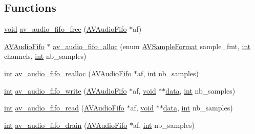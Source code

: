 \subsection*{Functions}
\begin{DoxyCompactItemize}
\item 
\hyperlink{sound_8c_ae35f5844602719cf66324f4de2a658b3}{void} \hyperlink{group__lavu__audio_ga74e029e47f7aa99217ad1f315c434875}{av\+\_\+audio\+\_\+fifo\+\_\+free} (\hyperlink{group__lavu__audio_ga328abb21e9abb2c455d2d9c212d5230f}{A\+V\+Audio\+Fifo} $\ast$af)
\item 
\hyperlink{group__lavu__audio_ga328abb21e9abb2c455d2d9c212d5230f}{A\+V\+Audio\+Fifo} $\ast$ \hyperlink{group__lavu__audio_ga9d792394f0615a329aec47847f8f8784}{av\+\_\+audio\+\_\+fifo\+\_\+alloc} (enum \hyperlink{samplefmt_8h_af9a51ca15301871723577c730b5865c5}{A\+V\+Sample\+Format} sample\+\_\+fmt, \hyperlink{xmltok_8h_a5a0d4a5641ce434f1d23533f2b2e6653}{int} channels, \hyperlink{xmltok_8h_a5a0d4a5641ce434f1d23533f2b2e6653}{int} nb\+\_\+samples)
\item 
\hyperlink{xmltok_8h_a5a0d4a5641ce434f1d23533f2b2e6653}{int} \hyperlink{group__lavu__audio_gae34e4eb0928f8e4539730d8c044c6139}{av\+\_\+audio\+\_\+fifo\+\_\+realloc} (\hyperlink{group__lavu__audio_ga328abb21e9abb2c455d2d9c212d5230f}{A\+V\+Audio\+Fifo} $\ast$af, \hyperlink{xmltok_8h_a5a0d4a5641ce434f1d23533f2b2e6653}{int} nb\+\_\+samples)
\item 
\hyperlink{xmltok_8h_a5a0d4a5641ce434f1d23533f2b2e6653}{int} \hyperlink{group__lavu__audio_ga0e7fadeea09c52a96eb4082a9e169bb4}{av\+\_\+audio\+\_\+fifo\+\_\+write} (\hyperlink{group__lavu__audio_ga328abb21e9abb2c455d2d9c212d5230f}{A\+V\+Audio\+Fifo} $\ast$af, \hyperlink{sound_8c_ae35f5844602719cf66324f4de2a658b3}{void} $\ast$$\ast$\hyperlink{lib_2expat_8h_ac39e72a1de1cb50dbdc54b08d0432a24}{data}, \hyperlink{xmltok_8h_a5a0d4a5641ce434f1d23533f2b2e6653}{int} nb\+\_\+samples)
\item 
\hyperlink{xmltok_8h_a5a0d4a5641ce434f1d23533f2b2e6653}{int} \hyperlink{group__lavu__audio_gab256fc29188d91311bd2fbd78eb356af}{av\+\_\+audio\+\_\+fifo\+\_\+read} (\hyperlink{group__lavu__audio_ga328abb21e9abb2c455d2d9c212d5230f}{A\+V\+Audio\+Fifo} $\ast$af, \hyperlink{sound_8c_ae35f5844602719cf66324f4de2a658b3}{void} $\ast$$\ast$\hyperlink{lib_2expat_8h_ac39e72a1de1cb50dbdc54b08d0432a24}{data}, \hyperlink{xmltok_8h_a5a0d4a5641ce434f1d23533f2b2e6653}{int} nb\+\_\+samples)
\item 
\hyperlink{xmltok_8h_a5a0d4a5641ce434f1d23533f2b2e6653}{int} \hyperlink{group__lavu__audio_gacac9b187b9c27c5a0374f6f83224a77b}{av\+\_\+audio\+\_\+fifo\+\_\+drain} (\hyperlink{group__lavu__audio_ga328abb21e9abb2c455d2d9c212d5230f}{A\+V\+Audio\+Fifo} $\ast$af, \hyperlink{xmltok_8h_a5a0d4a5641ce434f1d23533f2b2e6653}{int} nb\+\_\+samples)

\end{DoxyCompactItemize}
